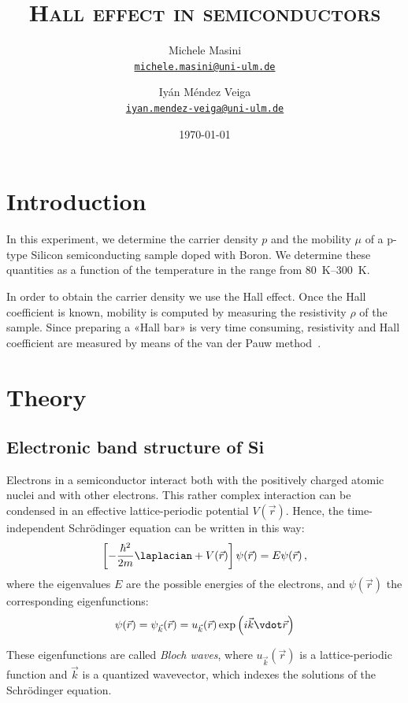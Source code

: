 \documentclass[11pt,a4paper]{article}
\title{\bfseries\textsc{Hall effect in semiconductors}}
\author{
Michele Masini\\ \small\texttt{\href{mailto:michele.masini@uni-ulm.de}{michele.masini@uni-ulm.de}}\and
Iyán Méndez Veiga\\ \small\texttt{\href{mailto:iyan.mendez-veiga@uni-ulm.de}{iyan.mendez-veiga@uni-ulm.de}}
}
\date{\today}
\begin{document}
\maketitle

\section{Introduction}
In this experiment, we determine the carrier density $p$ and the mobility $\mu$ of a p-type Silicon semiconducting sample doped with Boron. We determine these quantities as a function of the temperature in the range from \SIrange{80}{300}{\kelvin}.

In order to obtain the carrier density we use the Hall effect. Once the Hall coefficient is known, mobility is computed by measuring the resistivity $\rho$ of the sample. Since preparing a «Hall bar» is very time consuming, resistivity and Hall coefficient are measured by means of the van der Pauw method~\cite{vdP}.

\section{Theory}

\subsection{Electronic band structure of Si}

Electrons in a semiconductor interact both with the positively charged atomic nuclei and with other electrons. This rather complex interaction can be condensed in an effective lattice-periodic potential $V(\vec{r})$. Hence, the time-independent Schrödinger equation can be written in this way:
\begin{equation}\label{eq:Schr}
\left[-\frac{\hbar^2}{2m}\laplacian + V(\vec{r})\right]\psi(\vec{r})=E\psi(\vec{r})\,,
\end{equation}
where the eigenvalues $E$ are the possible energies of the electrons, and $\psi(\vec{r})$ the corresponding eigenfunctions:
\begin{equation*}
\psi(\vec{r})=\psi_{\vec{k}}(\vec{r})=u_{\vec{k}}(\vec{r})\exp\left(i\vec{k}\vdot\vec{r}\right)
\end{equation*}

These eigenfunctions are called \emph{Bloch waves}, where $u_{\vec{k}}(\vec{r})$ is a lattice-periodic function and $\vec{k}$ is a quantized wavevector, which indexes the solutions of the Schrödinger equation.
\end{document}

